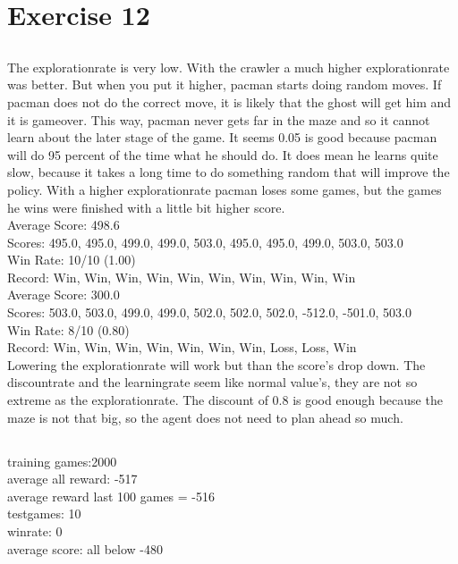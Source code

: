 \section{Exercise 12}
\subsection{}
The explorationrate is very low. With the crawler a much higher 
explorationrate was better. But when you put it higher, pacman starts 
doing random moves. If pacman does not do the correct move, it is 
likely that the ghost will get him and it is gameover. This way, pacman
never gets far in the maze and so it cannot learn about the later stage
of the game. It seems 0.05 is good because pacman will do 95 percent 
of the time what he should do. It does mean he learns quite slow, because
it takes a long time to do something random that will improve the policy.
With a higher explorationrate pacman loses some games, but the 
games he wins were finished with a little bit higher score.\\
Average Score: 498.6\\
Scores:        495.0, 495.0, 499.0, 499.0, 503.0, 495.0, 495.0, 499.0, 503.0, 503.0\\
Win Rate:      10/10 (1.00)\\
Record:        Win, Win, Win, Win, Win, Win, Win, Win, Win, Win\\
Average Score: 300.0\\
Scores:        503.0, 503.0, 499.0, 499.0, 502.0, 502.0, 502.0, -512.0, -501.0, 503.0\\
Win Rate:      8/10 (0.80)\\
Record:        Win, Win, Win, Win, Win, Win, Win, Loss, Loss, Win\\

Lowering the explorationrate will work but than the score's drop down.
The discountrate and the learningrate seem like normal value's, they 
are not so extreme as the explorationrate. The discount of 0.8 is good 
enough because the maze is not that big, so the agent does not need to 
plan ahead so much.

\subsection{}
training games:2000\\
average all reward: -517\\
average reward last 100 games = -516\\
testgames: 10\\
winrate: 0\\
average score: all below -480\\

